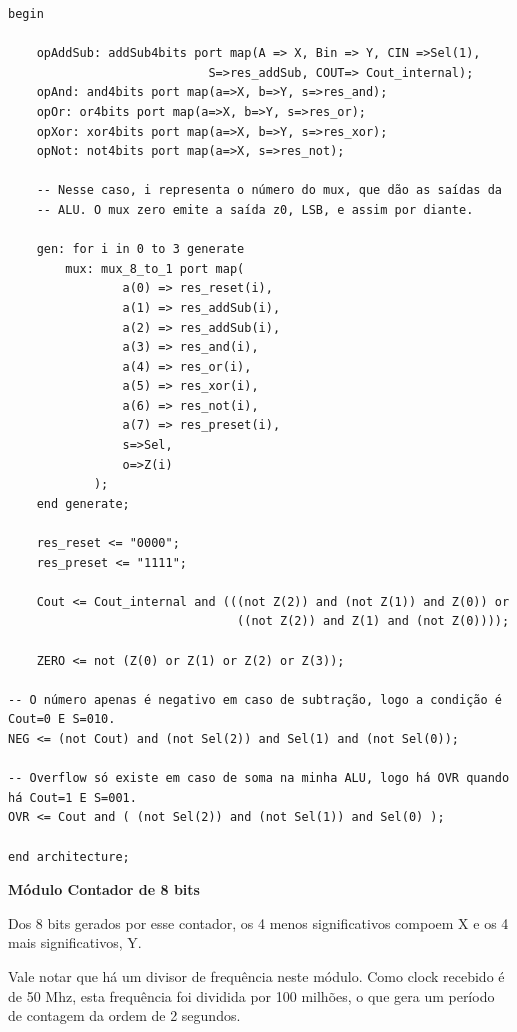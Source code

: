 \documentclass{article}
\begin{document}
\begin{verbatim}
begin
	
	opAddSub: addSub4bits port map(A => X, Bin => Y, CIN =>Sel(1),
                            S=>res_addSub, COUT=> Cout_internal);
	opAnd: and4bits port map(a=>X, b=>Y, s=>res_and);
	opOr: or4bits port map(a=>X, b=>Y, s=>res_or);
	opXor: xor4bits port map(a=>X, b=>Y, s=>res_xor);
	opNot: not4bits port map(a=>X, s=>res_not);
	
	-- Nesse caso, i representa o número do mux, que dão as saídas da
	-- ALU. O mux zero emite a saída z0, LSB, e assim por diante.
	
	gen: for i in 0 to 3 generate
		mux: mux_8_to_1 port map(
				a(0) => res_reset(i),
				a(1) => res_addSub(i),
				a(2) => res_addSub(i),
				a(3) => res_and(i),
				a(4) => res_or(i),
				a(5) => res_xor(i),
				a(6) => res_not(i),
				a(7) => res_preset(i),
				s=>Sel,
				o=>Z(i)
			);
	end generate;
	
	res_reset <= "0000";
	res_preset <= "1111";
	
	Cout <= Cout_internal and (((not Z(2)) and (not Z(1)) and Z(0)) or 
                                ((not Z(2)) and Z(1) and (not Z(0)))); 

	ZERO <= not (Z(0) or Z(1) or Z(2) or Z(3));

-- O número apenas é negativo em caso de subtração, logo a condição é Cout=0 E S=010.
NEG <= (not Cout) and (not Sel(2)) and Sel(1) and (not Sel(0));

-- Overflow só existe em caso de soma na minha ALU, logo há OVR quando há Cout=1 E S=001.
OVR <= Cout and ( (not Sel(2)) and (not Sel(1)) and Sel(0) ); 	

end architecture;

\end{verbatim}

\textbf{Módulo Contador de 8 bits}
\newline

Dos 8 bits gerados por esse contador, os 4 menos significativos compoem X e os 
4 mais significativos, Y.

Vale notar que há um divisor de frequência neste módulo. Como clock recebido é de 
50 Mhz, esta frequência foi dividida por 100 milhões, o que gera um período de
contagem da ordem de 2 segundos.
\end{document}

